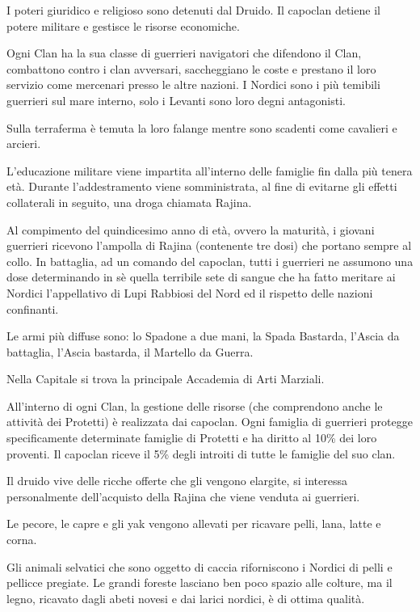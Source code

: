 I poteri giuridico e religioso sono detenuti dal Druido. Il capoclan
detiene il potere militare e gestisce le risorse economiche.

\Esercito Ogni Clan ha la sua classe di guerrieri navigatori che
difendono il Clan, combattono contro i clan avversari, saccheggiano le
coste e prestano il loro servizio come mercenari presso le altre
nazioni. I Nordici sono i pi\`u temibili guerrieri sul mare interno,
 solo i Levanti sono loro degni antagonisti.

Sulla terraferma \`e temuta la loro falange mentre sono scadenti come
cavalieri e arcieri.

L'educazione militare viene impartita all'interno delle famiglie fin
dalla pi\`u tenera et\`a. Durante l'addestramento viene somministrata,
al fine di evitarne gli effetti collaterali in seguito, una droga chiamata
Rajina. 

Al compimento del quindicesimo anno di et\`a, ovvero la maturit\`a, i
giovani guerrieri ricevono l'ampolla di Rajina (contenente tre dosi)
che portano sempre al collo. In battaglia, ad un comando del capoclan,
tutti i guerrieri ne assumono una dose determinando in s\`e quella
terribile sete di sangue che ha fatto meritare ai Nordici
l'appellativo di Lupi Rabbiosi del Nord ed il rispetto delle nazioni
confinanti.

Le armi pi\`u diffuse sono: lo Spadone a due mani, la Spada Bastarda,
l'Ascia da battaglia, l'Ascia bastarda, il Martello da Guerra.

Nella Capitale si trova la principale Accademia di Arti Marziali.

\Economia All'interno di ogni Clan, la gestione delle risorse (che
comprendono anche le attivit\`a dei Protetti) \`e realizzata dai
capoclan.  Ogni famiglia di guerrieri protegge specificamente
determinate famiglie di Protetti e ha diritto al 10\% dei loro
proventi.  Il capoclan riceve il 5\% degli introiti di tutte le
famiglie del suo clan. 

Il druido vive delle ricche offerte che gli vengono elargite, si interessa
personalmente dell'acquisto della Rajina che viene venduta
ai guerrieri.

Le pecore, le capre e gli yak vengono allevati per ricavare pelli, lana,
latte e corna. 

Gli animali selvatici che sono oggetto di caccia riforniscono i
Nordici di pelli e pellicce pregiate.
Le grandi foreste lasciano ben poco spazio alle colture, ma il legno,
ricavato dagli abeti novesi e dai larici nordici, \`e di ottima
qualit\`a.

